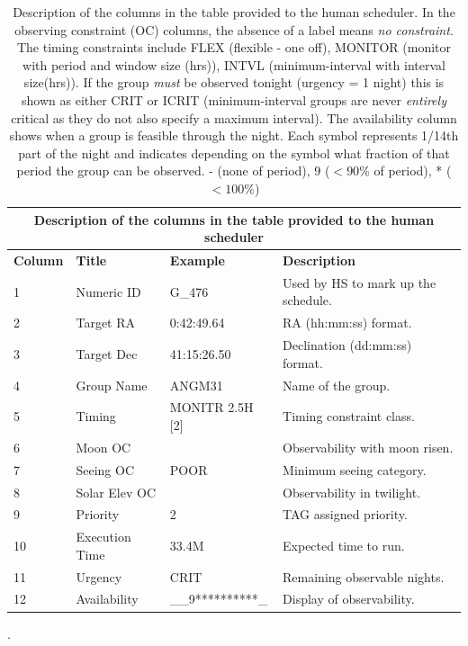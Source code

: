 \begin{table}
\begin{center}
\begin{tabular}{lllp{6cm}}
\toprule
\multicolumn{4}{c}{Description of the columns in the table provided to the human scheduler} \\
\midrule
{\bf Column} & {\bf Title}  & {\bf Example} & {\bf Description}\\
\midrule
1  & Numeric ID     & G\_476          & Used by HS to mark up the schedule.\\
2  & Target RA      & 0:42:49.64      & RA (hh:mm:ss) format.\\
3  & Target Dec     & 41:15:26.50     & Declination (dd:mm:ss) format.\\
4  & Group Name     & ANGM31          & Name of the group.\\
5  & Timing         & MONITR 2.5H [2] & Timing constraint class.\\
6  & Moon OC        &                 & Observability with moon risen.\\
7  & Seeing OC      & POOR            & Minimum seeing category.\\
8  & Solar Elev OC  &                 & Observability in twilight.\\
9  & Priority       & 2               & TAG assigned priority.\\
10 & Execution Time & 33.4M           & Expected time to run.\\
11 & Urgency        & CRIT              & Remaining observable nights.\\
12 & Availability   & \_\_9**********\_ & Display of observability. \\
\bottomrule
\end{tabular}
\caption[Description of the columns in the table provided to the human scheduler]
{Description of the columns in the table provided to the human scheduler. In the observing constraint (OC) columns, the absence of a label means \emph{no constraint}. The timing constraints include FLEX (flexible - one off), MONITOR (monitor with period and window size (hrs)), INTVL (minimum-interval with interval size(hrs)). If the group \emph{must} be observed tonight (urgency = 1 night) this is shown as either CRIT or ICRIT (minimum-interval groups are never \emph{entirely} critical as they do not also specify a maximum interval). The availability column shows when a group is feasible through the night. Each symbol represents 1/14th part of the night and indicates depending on the symbol what fraction of that period the group can be observed. - (none of period), 9 ($<90$\% of period), * ($<100$\%) }.
\label{tab:hsgexample}
\end{center}
\end{table}


